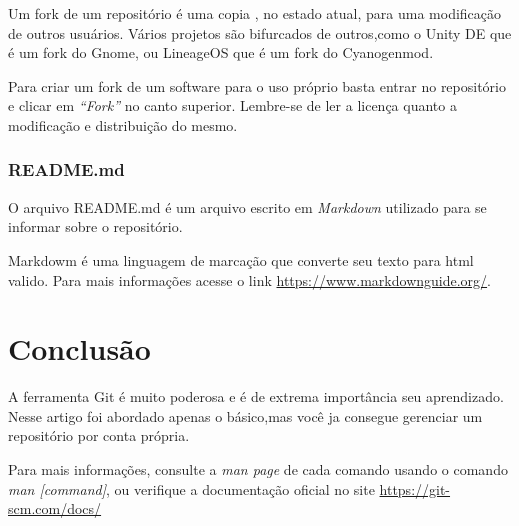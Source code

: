 \documentclass[]{article}
\begin{document}
Um fork de um repositório é uma copia , no estado atual, para uma modificação de outros usuários.
Vários projetos são bifurcados de outros,como o Unity DE que é um fork do Gnome, ou LineageOS que é um fork do Cyanogenmod.

Para criar um fork de um software para o uso próprio basta entrar no repositório e clicar em \textit{``Fork''} no canto superior.
Lembre-se de ler a licença quanto a modificação e distribuição do mesmo.

\subsubsection*{README.md}

O arquivo README.md é um arquivo escrito em \textit{Markdown} utilizado para se informar sobre o repositório.

Markdowm é uma linguagem de marcação que converte seu texto para html valido. 
Para mais informações acesse o link \url{https://www.markdownguide.org/}.
\section{Conclusão}
A ferramenta Git é muito poderosa e é de extrema importância seu aprendizado.
Nesse artigo foi abordado apenas o básico,mas você ja consegue gerenciar um repositório por conta própria.

Para mais informações, consulte  a \textit{man page} de cada comando usando o comando \textit{man [command]}, 
ou  verifique a documentação oficial no site \url{https://git-scm.com/docs/}
\end{document}
